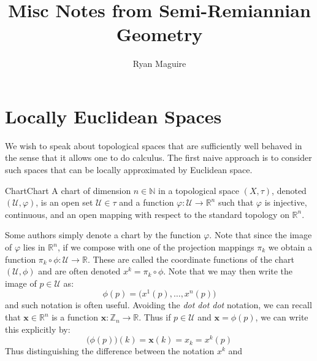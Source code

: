 \documentclass{article}                                                        %
\begin{document}
    \title{Misc Notes from Semi-Remiannian Geometry}
    \author{Ryan Maguire}
    \date{\vspace{-5ex}}
    \maketitle
    \tableofcontents
    \section{Locally Euclidean Spaces}
        We wish to speak about topological spaces that are sufficiently well
        behaved in the sense that it allows one to do calculus. The first
        naive approach is to consider such spaces that can be locally
        approximated by Euclidean space.
        \begin{fdefinition}{Chart}{Chart}
            A chart of dimension $n\in\mathbb{N}$ in a topological space
            $(X,\tau)$, denoted $(\mathcal{U},\varphi)$, is an open set
            $\mathcal{U}\in\tau$ and a function
            $\varphi:\mathcal{U}\rightarrow\mathbb{R}^{n}$ such that
            $\varphi$ is injective, continuous, and an open mapping with
            respect to the standard topology on $\mathbb{R}^{n}$.
        \end{fdefinition}
        Some authors simply denote a chart by the function $\varphi$. Note
        that since the image of $\varphi$ lies in $\mathbb{R}^{n}$, if we
        compose with one of the projection mappings $\pi_{k}$ we obtain a
        function $\pi_{k}\circ\phi:\mathcal{U}\rightarrow\mathbb{R}$. These
        are called the coordinate functions of the chart
        $(\mathcal{U},\phi)$ and are often denoted $x^{k}=\pi_{k}\circ\phi$.
        Note that we may then write the image of $p\in\mathcal{U}$ as:
        \begin{equation}
            \phi(p)=\big(x^{1}(p),\dots,x^{n}(p)\big)
        \end{equation}
        and such notation is often useful. Avoiding the \textit{dot dot dot}
        notation, we can recall that $\mathbf{x}\in\mathbb{R}^{n}$ is a
        function $\mathbf{x}:\mathbb{Z}_{n}\rightarrow\mathbb{R}$. Thus if
        $p\in\mathcal{U}$ and $\mathbf{x}=\phi(p)$, we can write this
        explicitly by:
        \begin{equation}
            \big(\phi(p)\big)(k)=\mathbf{x}(k)=x_{k}=x^{k}(p)
        \end{equation}
        Thus distinguishing the difference between the notation $x^{k}$ and
\end{document}
